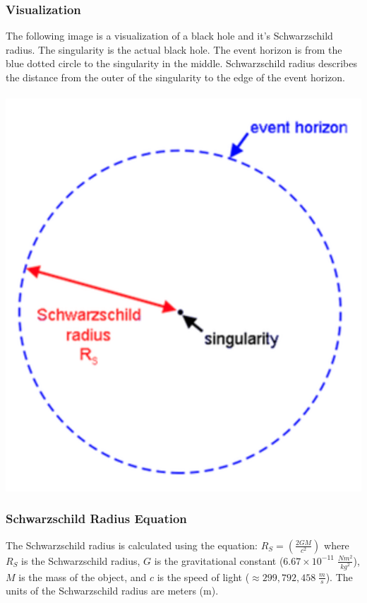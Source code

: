 \documentclass{article}
\begin{document}
\subsubsection{Visualization}
The following image is a visualization of a black hole and it's Schwarzschild radius. The singularity is the actual black hole. The event horizon is from the blue dotted circle to the singularity in the middle. Schwarzschild radius describes the distance from the outer of the singularity to the edge of the event horizon.\\\\
\includegraphics[scale=0.4]{images/schwarzschild_radius.png}

\subsubsection{Schwarzschild Radius Equation}\label{sec:schwarzschild_radius_equation}
The Schwarzschild radius is calculated using the equation: $R_{S} = \left(\frac{2GM}{c^2}\right)$ where $R_{S}$ is the Schwarzschild radius, $G$ is the gravitational constant (\hyperref[sec:constants]{$6.67 \times 10^{-11}\;\frac{Nm^2}{kg^2}$}), $M$ is the mass of the object, and $c$ is the speed of light (\hyperref[sec:constants]{$\approx 299, 792, 458\;\frac{m}{s}$}). The units of the Schwarzschild radius are meters (m).
\end{document}
